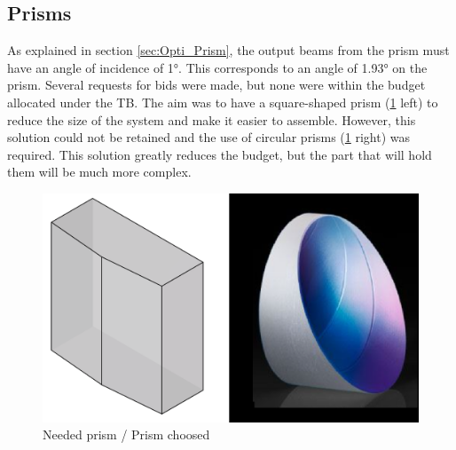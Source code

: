 \subsection{Prisms}
As explained in section \ref{sec:Opti_Prism}, the output beams from the prism must have an angle of incidence of 1°. 
This corresponds to an angle of 1.93° on the prism. \newline
Several requests for bids were made, but none were within the budget allocated under the TB. The aim was to have a square-shaped 
prism (\ref{fig:Prism_square} left) to reduce the size of the system and make it easier to assemble. However, this solution could not be retained and the 
use of circular prisms (\ref{fig:Prism_square} right) was required. This solution greatly reduces the budget, but the part that will hold them will be much more complex.
\begin{figure}[H]
    \centering
    \includegraphics[scale=0.5]{assets/figures/Mechanical Design/prisme_voulu.png}
    \caption{Needed prism / Prism choosed}
    \label{fig:Prism_square}
\end{figure}
